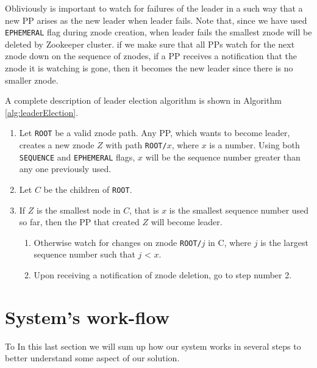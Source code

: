 \documentclass[sigchi]{acmart}
\begin{document}
Obliviously is important to watch for failures of the leader in a such way that a new PP arises as the new leader when leader fails. Note that, since we have used \texttt{EPHEMERAL} flag during znode creation, when leader fails the smallest znode will be deleted by Zookeeper cluster. if we make sure that all PPs watch for the next znode down on the sequence of znodes, if a PP receives a notification that the znode it is watching is gone, then it becomes the new leader since there is no smaller znode. 

A complete description of leader election algorithm is shown in Algorithm \ref{alg:leaderElection}.

\begin{algorithm}
\caption{}\label{alg:leaderElection}
\begin{enumerate}

\item Let \texttt{ROOT} be a valid znode path. Any PP, which wants to become leader, creates a new znode $Z$ with path \texttt{ROOT/$x$}, where $x$ is a number. Using both \texttt{SEQUENCE} and \texttt{EPHEMERAL} flags, $x$ will be the sequence number greater than any one previously used.

\item Let $C$ be the children of \texttt{ROOT}. 

\item If $Z$ is the smallest node in $C$, that is $x$ is the smallest sequence number used so far, then the PP that created $Z$ will become leader.

\begin{enumerate}

\item Otherwise watch for changes on znode \texttt{ROOT/$j$} in C, where $j$ is the largest sequence number such that $j$ < $x$.

\item Upon receiving a notification of znode deletion, go to step number 2.

\end{enumerate}
\end{enumerate}
\end{algorithm}

\section{System's work-flow}

To In this last section we will sum up how our system works in several steps to better understand some aspect of our solution.
\end{document}
